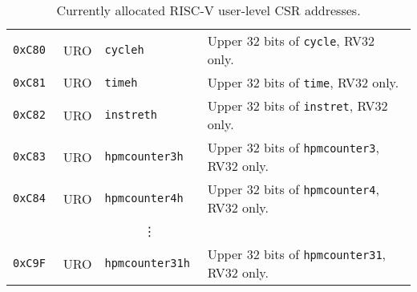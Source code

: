 \begin{table}[htb!]
\begin{center}
\begin{tabular}{|l|l|l|l|}
\tt 0xC80 & URO  &\tt cycleh        & Upper 32 bits of {\tt cycle}, RV32 only. \\
\tt 0xC81 & URO  &\tt timeh         & Upper 32 bits of {\tt time}, RV32 only. \\
\tt 0xC82 & URO  &\tt instreth      & Upper 32 bits of {\tt instret}, RV32 only. \\
\tt 0xC83 & URO  &\tt hpmcounter3h  & Upper 32 bits of {\tt hpmcounter3}, RV32 only. \\
\tt 0xC84 & URO  &\tt hpmcounter4h  & Upper 32 bits of {\tt hpmcounter4}, RV32 only. \\
& & \multicolumn{1}{c|}{\vdots} & \ \\
\tt 0xC9F & URO  &\tt hpmcounter31h & Upper 32 bits of {\tt hpmcounter31}, RV32 only. \\
\hline
\end{tabular}
\end{center}
\caption{Currently allocated RISC-V user-level CSR addresses.}
\label{ucsrnames}
\end{table}

